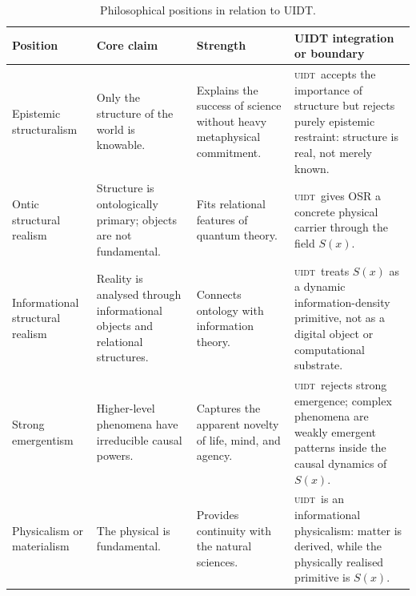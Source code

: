 \documentclass[12pt,a4paper,twoside]{article}
\theoremstyle{plain}
\theoremstyle{definition}
\theoremstyle{remark}
\newcommand{\UIDT}{\textsc{uidt}}
\newcommand{\Sx}{S(x)}
\begin{document}
\begin{table}[H]
\centering
\footnotesize
{\setlength{\tabcolsep}{2.5pt}%
\renewcommand{\arraystretch}{1.08}%
\begin{tabular}{@{}>{\raggedright\arraybackslash}p{3.0cm}
                >{\raggedright\arraybackslash}p{3.45cm}
                >{\raggedright\arraybackslash}p{3.35cm}
                >{\raggedright\arraybackslash}p{4.25cm}@{}}
\toprule
\textbf{Position} & \textbf{Core claim} & \textbf{Strength} & \textbf{UIDT integration or boundary} \\
\midrule
Epistemic structuralism & Only the structure of the world is knowable. &
Explains the success of science without heavy metaphysical commitment. &
\UIDT\ accepts the importance of structure but rejects purely epistemic restraint:
structure is real, not merely known. \\
\midrule
Ontic structural realism & Structure is ontologically primary; objects are not
fundamental. & Fits relational features of quantum theory. &
\UIDT\ gives OSR a concrete physical carrier through the field $\Sx$. \\
\midrule
Informational structural realism & Reality is analysed through informational
objects and relational structures. & Connects ontology with information theory. &
\UIDT\ treats $\Sx$ as a dynamic information-density primitive, not as a digital
object or computational substrate. \\
\midrule
Strong emergentism & Higher-level phenomena have irreducible causal powers. &
Captures the apparent novelty of life, mind, and agency. &
\UIDT\ rejects strong emergence; complex phenomena are weakly emergent patterns
inside the causal dynamics of $\Sx$. \\
\midrule
Physicalism or materialism & The physical is fundamental. & Provides continuity
with the natural sciences. & \UIDT\ is an informational physicalism: matter is
derived, while the physically realised primitive is $\Sx$. \\
\bottomrule
\end{tabular}}
\caption{Philosophical positions in relation to UIDT.}
\label{tab:phil-comparison}
\end{table}
\newpage
\thispagestyle{uidtontology}
\vspace*{\fill}
\end{document}

